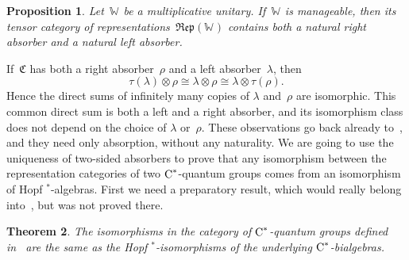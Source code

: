 \documentclass[a4paper]{amsart}
\numberwithin{equation}{section}
\theoremstyle{plain}
\newtheorem{theorem}{Theorem}
\numberwithin{theorem}{section}
\newtheorem{proposition}[theorem]{Proposition}
\theoremstyle{definition}
\theoremstyle{remark}
\newcommand*{\Cat}{\mathfrak C}     %
\newcommand*{\Corepcat}[1]{\mathfrak{Rep}(#1)}%
\newcommand*{\Trivial}{\tau}%
\newcommand*{\nb}{\nobreakdash}
\newcommand*{\Star}{$^*$\nb-}
\newcommand*{\Multunit}[1][]{\mathbb W^{#1}}%
\newcommand*{\Cst}{\textup C^*}%
\begin{document}
\begin{proposition}
  \label{pro:left_right_absorber}
  Let~\(\Multunit\) be a multiplicative unitary.  If~\(\Multunit\)
  is manageable, then its tensor category of
  representations~\(\Corepcat{\Multunit}\) contains both a natural
  right absorber and a natural left absorber.
\end{proposition}

If~\(\Cat\) has both a right absorber~\(\rho\) and a left
absorber~\(\lambda\), then
\[
\Trivial(\lambda) \otimes \rho \cong \lambda\otimes\rho
\cong \lambda\otimes\Trivial(\rho).
\]
Hence the direct sums of infinitely many copies of \(\lambda\)
and~\(\rho\) are isomorphic.  This common direct sum is both a left
and a right absorber, and its isomorphism class does not depend on
the choice of \(\lambda\) or~\(\rho\).  These observations go back
already to~\cite{Pinzari-Roberts:Regular}, and they need only
absorption, without any naturality.  We are going to use the
uniqueness of two-sided absorbers to prove that any isomorphism
between the representation categories of two \(\Cst\)\nb-quantum
groups comes from an isomorphism of Hopf \Star{}algebras.  First we
need a preparatory result, which would really belong
into~\cite{Meyer-Roy-Woronowicz:Homomorphisms}, but was not proved
there.

\begin{theorem}
  \label{the:isomorphisms_quantum_groups}
  The isomorphisms in the category of \(\Cst\)\nb-quantum
  groups defined in~\cite{Meyer-Roy-Woronowicz:Homomorphisms} are the
  same as the Hopf \Star{}isomorphisms of the underlying
  \(\Cst\)\nb-bialgebras.
\end{theorem}
\end{document}
